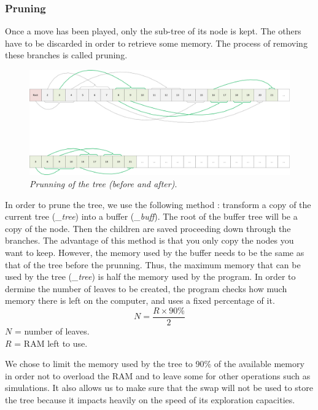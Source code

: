 \subsubsection{Pruning}
Once a move has been played, only the sub-tree of its node is kept. The others have to be discarded in order to retrieve some memory. The process of removing these branches is called pruning.
\begin{figure}[H] 
\centerline{\includegraphics[width=\textwidth]{Data_Structure/Img/array.png}}
\caption{\label{fig:arrayprunning}\textit{Prunning of the tree (before and after)}.}
\end{figure}
In order to prune the tree, we use the following method : transform a copy of the current tree (\textit{\_tree}) into a buffer (\textit{\_buff}). The root of the buffer tree will be a copy of the node. Then the children are saved proceeding down through the branches. The advantage of this method is that you only copy the nodes you want to keep. However, the memory used by the buffer needs to be the same as that of the tree before the prunning. Thus, the maximum memory that can be used by the tree (\textit{\_tree}) is half the memory used by the program. In order to dermine the number of leaves to be created, the program checks how much memory there is left on the computer, and uses a fixed percentage of it.
\begin{equation}
N = \frac{R \times 90\%}{2}
\end{equation}
\ensuremath{N} = number of leaves.\\
\ensuremath{R} = RAM left to use.

We chose to limit the memory used by the tree to 90\% of the available memory in order not to overload the RAM and to leave some for other operations such as simulations. It also allows us to make sure that the swap will not be used to store the tree because it impacts heavily on the speed of its exploration capacities.


